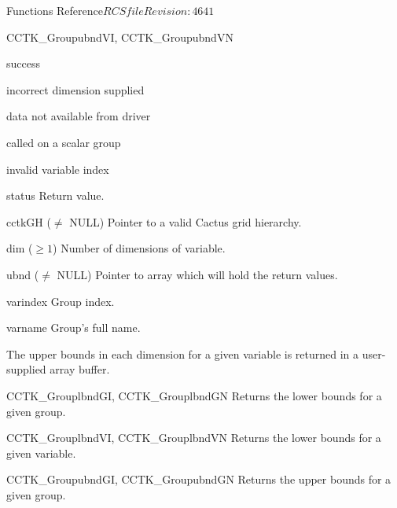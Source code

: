 \begin{cactuspart}{ Functions Reference}{$RCSfile$}{$Revision: 4641 $}
\begin{FunctionDescription}{CCTK\_GroupubndVI, CCTK\_GroupubndVN}
\begin{ResultSection}
\begin{Result}{0} success \end{Result}
\begin{Result}{-1} incorrect dimension supplied \end{Result}
\begin{Result}{-2} data not available from driver \end{Result}
\begin{Result}{-3} called on a scalar group \end{Result}
\begin{Result}{-4} invalid variable index \end{Result}
\end{ResultSection}

\begin{ParameterSection}
\begin{Parameter}{status} Return value. \end{Parameter}
\begin{Parameter}{cctkGH ($\ne$ NULL)} Pointer to a valid Cactus grid hierarchy. \end{Parameter}
\begin{Parameter}{dim ($\ge 1$)} Number of dimensions of variable. \end{Parameter}
\begin{Parameter}{ubnd ($\ne$ NULL)} Pointer to array which will hold the return values. \end{Parameter}
\begin{Parameter}{varindex} Group index. \end{Parameter}
\begin{Parameter}{varname} Group's full name. \end{Parameter}
\end{ParameterSection}

\begin{Discussion}
The upper bounds in each dimension for a given variable is returned in a user-supplied array buffer.
\end{Discussion}

\begin{SeeAlsoSection}
\begin{SeeAlso}{CCTK\_GrouplbndGI, CCTK\_GrouplbndGN}
Returns the lower bounds for a given group.
\end{SeeAlso}
\begin{SeeAlso}{CCTK\_GrouplbndVI, CCTK\_GrouplbndVN}
Returns the lower bounds for a given variable.
\end{SeeAlso}
\begin{SeeAlso}{CCTK\_GroupubndGI, CCTK\_GroupubndGN}
Returns the upper bounds for a given group.
\end{SeeAlso}
\end{SeeAlsoSection}
\end{FunctionDescription}



\end{cactuspart}
